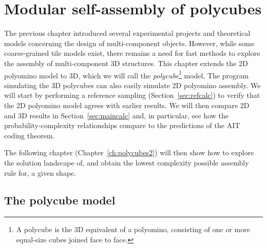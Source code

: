 \chapter{\label{ch:polycubes1}Modular self-assembly of polycubes}

\minitoc

The previous chapter introduced several experimental projects and theoretical models concerning the design of multi-component objects. However, while some coarse-grained tile models exist, there remains a need for fast methods to explore the assembly of multi-component 3D structures.
This chapter extends the 2D polyomino model \cite{ahnert2010self,johnston2011evolutionary, greenbury2014tractable} to 3D, which we will call the \emph{polycube}\footnote{A polycube is the 3D equivalent of a polyomino, consisting of one or more equal-size cubes joined face to face.} model. The program simulating the 3D polycubes can also easily simulate 2D polyomino assembly.
We will start by performing a reference sampling (Section~\ref{sec:refcalc}) to verify that the 2D polyomino model agrees with earlier results. We will then compare 2D and 3D results in Section~\ref{sec:maincalc} and, in particular, see how the probability-complexity relationships compare to the predictions of the AIT coding theorem.

The following chapter (Chapter~\ref{ch:polycubes2}) will then show how to explore the solution landscape of, and obtain the lowest complexity possible assembly rule for, a given shape.

\section{The polycube model}

